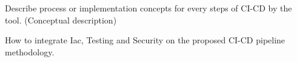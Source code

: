 Describe process or implementation concepts for every steps of CI-CD by the tool. (Conceptual description)

How to integrate Iac, Testing and Security on the proposed CI-CD pipeline methodology.